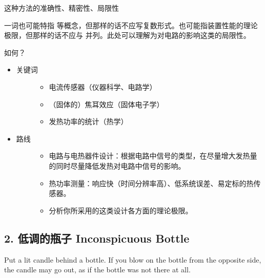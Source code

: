 \documentclass[a4paper,10pt,english]{sphinxmanual}
\begin{document}
这种方法的准确性、精密性、局限性 %
\begin{footnote}[1]\sphinxAtStartFootnote
{} 一词也可能特指  等概念，但那样的话不应写复数形式。也可能指装置性能的理论极限，但那样的话不应与  并列。此处可以理解为对电路的影响这类的局限性。
%
\end{footnote} 如何？
\begin{itemize}
\item {} \begin{description}
\item[{关键词}] \leavevmode\begin{itemize}
\item {} 
电流传感器（仪器科学、电路学）

\item {} 
（固体的）焦耳效应（固体电子学）

\item {} 
发热功率的统计（热学）

\end{itemize}

\end{description}

\item {} \begin{description}
\item[{路线}] \leavevmode\begin{itemize}
\item {} 
电路与电热器件设计：根据电路中信号的类型，在尽量增大发热量的同时尽量降低发热对电路中信号的影响。

\item {} 
热功率测量：响应快（时间分辨率高）、低系统误差、易定标的热传感器。

\item {} 
分析你所采用的这类设计各方面的理论极限。

\end{itemize}

\end{description}

\end{itemize}


\subsection{2. 低调的瓶子 Inconspicuous Bottle}
\label{\detokenize{7. Appendix:inconspicuous-bottle}}
Put a lit candle behind a bottle. If you blow on the bottle from the opposite side, the candle may go out, as if the bottle was not there at all.
\end{document}
